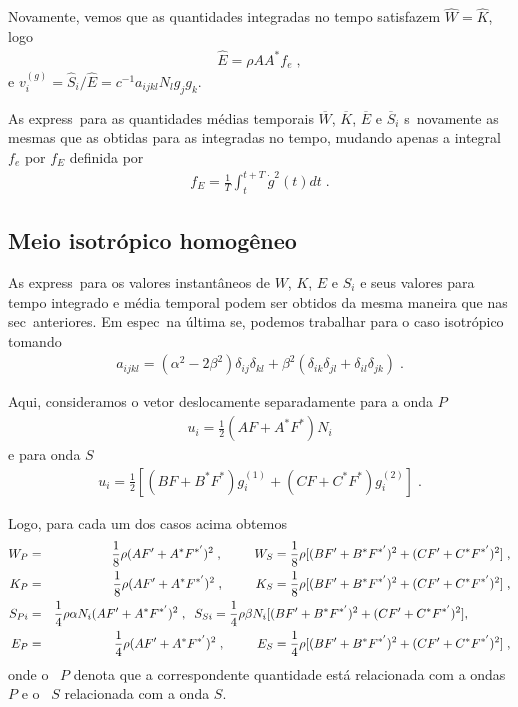 Novamente, vemos que as quantidades integradas no
tempo satisfazem $\hat{W} = \hat{K}$, logo
\begin{eqnarray}
\hat{E} = \rho A A^{*} f_e \; ,
\end{eqnarray}
e $v_i^{(g)} = \hat{S}_i/\hat{E} = c^{-1} a_{ijkl}
N_l g_j g_k$.

As express\oes\ para as quantidades
m\'edias temporais $\overline{W}$, $\overline{K}$,
$\overline{E}$ e $\overline{S}_i$ s\ao\ novamente
as mesmas que as obtidas para as integradas no
tempo, mudando apenas a integral $f_e$ por $f_E$
definida por
\begin{eqnarray}
f_E = \frac{1}{T} \int_{t}^{t+T} \dot{g}^2(t) dt \; .
\end{eqnarray}


\subsection{Meio isotr\'opico homog\^eneo}

As express\oes\ para os valores instant\^aneos de
$W$, $K$, $E$ e $S_i$ e seus valores para
tempo integrado e m\'edia temporal podem ser 
obtidos da mesma maneira que nas sec\oes\
anteriores. Em espec\ifico\ na \'ultima se\cao,
podemos trabalhar para o caso isotr\'opico
tomando
\begin{eqnarray}
a_{ijkl} = (\alpha^2 -2\beta^2)\delta_{ij}\delta_{kl}
+ \beta^2(\delta_{ik}\delta_{jl} + \delta_{il}
\delta_{jk}) \; .
\end{eqnarray}

Aqui, consideramos o vetor deslocamente
separadamente para a onda $P$
\begin{eqnarray}
u_i = \frac{1}{2} (AF + A^{*}F^{*}) N_i
\end{eqnarray}
e para onda $S$
\begin{eqnarray}
u_i = \frac{1}{2}[(BF + B^{*}F^{*}) g_i^{(1)} + 
(CF + C^{*}F^{*}) g_i^{(2)}] \; .
\end{eqnarray}

Logo, para cada um dos casos acima obtemos 
\begin{eqnarray}
W_P &=& \frac{1}{8} \rho (AF' + A^{*}F^{*'})^2 \; ,
\hspace{0.9cm}
W_S = \frac{1}{8} \rho [(BF' + B^{*}F^{*'})^2 +
(CF' + C^{*}F^{*'})^2] \; , \\
K_P &=& \frac{1}{8} \rho (AF' + A^{*}F^{*'})^2 \; ,
\hspace{0.9cm}
K_S = \frac{1}{8} \rho [(BF' + B^{*}F^{*'})^2 +
(CF' + C^{*}F^{*'})^2] \; , \\
S_{Pi}&=&\frac{1}{4}\rho\alpha N_i(AF'+A^{*}F^{*'})^2\; ,
\hspace{0.2cm}
S_{Si}=\frac{1}{4}\rho\beta N_i[(BF'+B^{*}F^{*'})^2 +
(CF'+C^{*}F^{*'})^2] , \hspace{1.2cm} \\
E_P &=& \frac{1}{4} \rho (AF' + A^{*}F^{*'})^2 \; ,
\hspace{0.9cm}
E_S = \frac{1}{4} \rho [(BF' + B^{*}F^{*'})^2 +
(CF' + C^{*}F^{*'})^2] \; ,
\end{eqnarray}
onde o \indice\ $P$ denota que a correspondente
quantidade est\'a relacionada com a ondas $P$ e o
\indice\ $S$ relacionada com a onda $S$.

